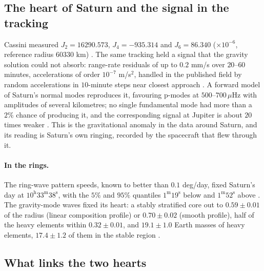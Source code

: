 \documentclass[11pt]{article}
\theoremstyle{definition}\newtheorem{definition}[theorem]{Definition}
\theoremstyle{remark}\newtheorem{remark}[theorem]{Remark}
\newcommand{\muH}{\,\mu\mathrm{Hz}}
\begin{document}
\subsection{The heart of Saturn and the signal in the tracking}\label{sec:saturnheart}
Cassini measured $J_2=16290.573$, $J_4=-935.314$ and $J_6=86.340$ ($\times10^{-6}$, reference radius $60330$ km) \cite{Iess}. The same tracking held a signal that the gravity solution could not absorb: range-rate residuals of up to $0.2$ mm/s over $20$--$60$ minutes, accelerations of order $10^{-7}$ m/s$^2$, handled in the published field by random accelerations in $10$-minute steps near closest approach \cite{Iess}. A forward model of Saturn's normal modes reproduces it, favouring p-modes at $500$--$700\muH$ with amplitudes of several kilometres; no single fundamental mode had more than a $2\%$ chance of producing it, and the corresponding signal at Jupiter is about $20$ times weaker \cite{Markham}. This is the gravitational anomaly in the data around Saturn, and its reading is Saturn's own ringing, recorded by the spacecraft that flew through it.

\paragraph{In the rings.} The ring-wave pattern speeds, known to better than $0.1$ deg/day, fixed Saturn's day at $10^\mathrm{h}33^\mathrm{m}38^\mathrm{s}$, with the $5\%$ and $95\%$ quantiles $1^\mathrm{m}19^\mathrm{s}$ below and $1^\mathrm{m}52^\mathrm{s}$ above \cite{Mankovich2019}. The gravity-mode waves fixed its heart: a stably stratified core out to $0.59\pm0.01$ of the radius (linear composition profile) or $0.70\pm0.02$ (smooth profile), half of the heavy elements within $0.32\pm0.01$, and $19.1\pm1.0$ Earth masses of heavy elements, $17.4\pm1.2$ of them in the stable region \cite{MankovichFuller}.

\subsection{What links the two hearts}\label{sec:links}
\end{document}
